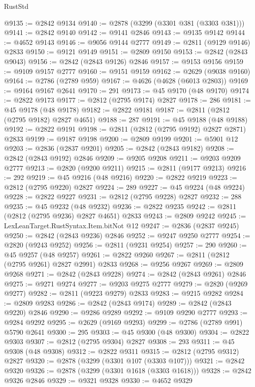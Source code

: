 \begin{lexlean}{RustStd}
\begin{coremodule}
@9135 := @2842 @9134
@9140 := @2878 (@3299 (@3301 @381 (@3303 @381)))
@9141 := @2842 @9140
@9142 := @9141 @2846
@9143 := @9135 @9142
@9144 := @4652 @9143
@9146 := @9056 @9144 @2777
@9149 := @2811 (@9129 @9146) @2833
@9150 := @9121 @9149
@9151 := @2809 @9150
@9153 := @2842 (@2843 @9043)
@9156 := @2842 (@2843 @9126) @2846
@9157 := @9153 @9156
@9159 := @9109 @9157 @2777
@9160 := @9151 @9159
@9162 := @2629 (@9038 @9160)
@9164 := @2786 (@2789 @959)
@9167 := @4626 (@4628 (@6013 @2803))
@9169 := @9164 @9167 @2641
@9170 := 291
@9173 := @45 @9170 (@48 @9170)
@9174 := @2822 @9173
@9177 := @2812 (@2795 @9174) @2827
@9178 := 286
@9181 := @45 @9178 (@48 @9178)
@9182 := @2822 @9181
@9187 := @2811 (@2812 (@2795 @9182) @2827 @4651)
@9188 := 287
@9191 := @45 @9188 (@48 @9188)
@9192 := @2822 @9191
@9198 := @2811 (@2812 (@2795 @9192) @2827 @2871) @2833
@9199 := @9187 @9198
@9200 := @2809 @9199
@9201 := @5901 @12
@9203 := @2836 (@2837 @9201)
@9205 := @2842 (@2843 @9182)
@9208 := @2842 (@2843 @9192) @2846
@9209 := @9205 @9208
@9211 := @9203 @9209 @2777
@9213 := @2820 (@9200 @9211)
@9215 := @2811 (@9177 @9213)
@9216 := 292
@9219 := @45 @9216 (@48 @9216)
@9220 := @2822 @9219
@9223 := @2812 (@2795 @9220) @2827
@9224 := 289
@9227 := @45 @9224 (@48 @9224)
@9228 := @2822 @9227
@9231 := @2812 (@2795 @9228) @2827
@9232 := 288
@9235 := @45 @9232 (@48 @9232)
@9236 := @2822 @9235
@9242 := @2811 (@2812 (@2795 @9236) @2827 @4651) @2833
@9243 := @2809 @9242
@9245 := LexLeanTarget.RustSyntax.Item.bitNot @12
@9247 := @2836 (@2837 @9245)
@9250 := @2842 (@2843 @9236) @2846
@9252 := @9247 @9250 @2777
@9254 := @2820 (@9243 @9252)
@9256 := @2811 (@9231 @9254)
@9257 := 290
@9260 := @45 @9257 (@48 @9257)
@9261 := @2822 @9260
@9267 := @2811 (@2812 (@2795 @9261) @2827 @2991) @2833
@9268 := @9256 @9267
@9269 := @2809 @9268
@9271 := @2842 (@2843 @9228)
@9274 := @2842 (@2843 @9261) @2846
@9275 := @9271 @9274
@9277 := @9203 @9275 @2777
@9279 := @2820 (@9269 @9277)
@9282 := @2811 (@9223 @9279) @2833
@9283 := @9215 @9282
@9284 := @2809 @9283
@9286 := @2842 (@2843 @9174)
@9289 := @2842 (@2843 @9220) @2846
@9290 := @9286 @9289
@9292 := @9109 @9290 @2777
@9293 := @9284 @9292
@9295 := @2629 (@9169 @9293)
@9299 := @2786 (@2789 @991) @5790 @2641
@9300 := 295
@9303 := @45 @9300 (@48 @9300)
@9304 := @2822 @9303
@9307 := @2812 (@2795 @9304) @2827
@9308 := 293
@9311 := @45 @9308 (@48 @9308)
@9312 := @2822 @9311
@9315 := @2812 (@2795 @9312) @2827
@9320 := @2878 (@3299 (@3301 @107 (@3303 @107)))
@9321 := @2842 @9320
@9326 := @2878 (@3299 (@3301 @1618 (@3303 @1618)))
@9328 := @2842 @9326 @2846
@9329 := @9321 @9328
@9330 := @4652 @9329

\end{coremodule}
\end{lexlean}

